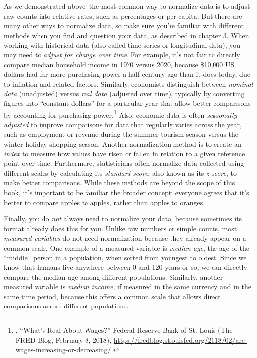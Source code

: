 \documentclass[
  english,
]{book}
\begin{document}
As we demonstrated above, the most common way to normalize data is to adjust raw counts into relative rates, such as percentages or per capita. But there are many other ways to normalize data, so make sure you're familiar with different methods when you \href{find.html}{find and question your data, as described in chapter 3}. When working with historical data (also called time-series or longitudinal data), you may need to \emph{adjust for change over time}. For example, it's not fair to directly compare median household income in 1970 versus 2020, because \$10,000 US dollars had far more purchasing power a half-century ago than it does today, due to inflation and related factors. Similarly, economists distinguish between \emph{nominal data} (unadjusted) versus \emph{real data} (adjusted over time), typically by converting figures into ``constant dollars'' for a particular year that allow better comparisons by accounting for purchasing power.\footnote{, {``What's {Real About Wages}?''} Federal Reserve Bank of St. Louis ({The FRED Blog}, February 8, 2018), \url{https://fredblog.stlouisfed.org/2018/02/are-wages-increasing-or-decreasing/}.} Also, economic data is often \emph{seasonally adjusted} to improve comparisons for data that regularly varies across the year, such as employment or revenue during the summer tourism season versus the winter holiday shopping season. Another normalization method is to create an \emph{index} to measure how values have risen or fallen in relation to a given reference point over time. Furthermore, statisticians often normalize data collected using different scales by calculating its \emph{standard score}, also known as its \emph{z-score}, to make better comparisons. While these methods are beyond the scope of this book, it's important to be familiar the broader concept: everyone agrees that it's better to compare apples to apples, rather than apples to oranges.

Finally, you do \emph{not} always need to normalize your data, because sometimes its format already does this for you. Unlike raw numbers or simple counts, most \emph{measured variables} do not need normalization because they already appear on a common scale. One example of a measured variable is \emph{median age}, the age of the ``middle'' person in a population, when sorted from youngest to oldest. Since we know that humans live anywhere between 0 and 120 years or so, we can directly compare the median age among different populations. Similarly, another measured variable is \emph{median income}, if measured in the same currency and in the same time period, because this offers a common scale that allows direct comparisons across different populations.
\end{document}

